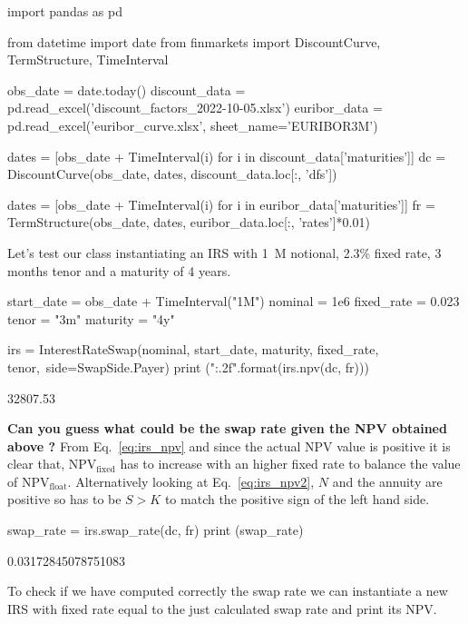\begin{ipython}
import pandas as pd

from datetime import date
from finmarkets import DiscountCurve, TermStructure, TimeInterval

obs_date = date.today()
discount_data = pd.read_excel('discount_factors_2022-10-05.xlsx')
euribor_data = pd.read_excel('euribor_curve.xlsx', sheet_name='EURIBOR3M')

dates = [obs_date + TimeInterval(i) for i in discount_data['maturities']]
dc = DiscountCurve(obs_date, dates, discount_data.loc[:, 'dfs'])

dates = [obs_date + TimeInterval(i) for i in euribor_data['maturities']]
fr = TermStructure(obs_date, dates, euribor_data.loc[:, 'rates']*0.01)
\end{ipython}

Let's test our class instantiating an IRS with 1~M notional, 2.3\% fixed rate, 3 months tenor and a maturity of 4 years.

\begin{ipython}
start_date = obs_date + TimeInterval("1M")
nominal = 1e6
fixed_rate = 0.023
tenor = "3m"
maturity = "4y"

irs = InterestRateSwap(nominal, start_date, maturity, fixed_rate, tenor,\
                       side=SwapSide.Payer)
print ("{:.2f}".format(irs.npv(dc, fr)))
\end{ipython}
\begin{ioutput}
32807.53
\end{ioutput}
\textbf{Can you guess what could be the \textbf{swap rate} given the NPV obtained above ?}
\noindent
From Eq.~\ref{eq:irs_npv} and since the actual NPV value is positive it is clear that, NPV$_{\textrm{fixed}}$ has to increase with an higher fixed rate to balance the value of NPV$_{\textrm{float}}$.
Alternatively looking at Eq.~\ref{eq:irs_npv2}, $N$ and the annuity are positive so has to be $S > K$ to match the positive sign of the left hand side.  

\begin{ipython}
swap_rate = irs.swap_rate(dc, fr)
print (swap_rate)
\end{ipython}
\begin{ioutput}
0.03172845078751083
\end{ioutput}
    
To check if we have computed correctly the swap rate we can instantiate a new IRS with fixed rate equal to the just calculated swap rate and print its NPV.


